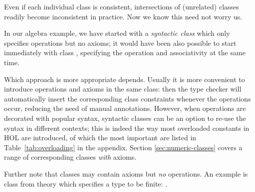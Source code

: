 \begin{isabellebody}
\begin{isamarkuptext}
Even if each individual class is consistent, intersections of
(unrelated) classes readily become inconsistent in practice. Now we
know this need not worry us.%
\end{isamarkuptext}%
\isamarkuptrue%
%
\isamarkuptrue%
%
\begin{isamarkuptext}%
In our algebra example, we have started with a \emph{syntactic
class}  which only specifies operations but no axioms; it
would have been also possible to start immediately with class , specifying the  operation and associativity at
the same time.

Which approach is more appropriate depends.  Usually it is more
convenient to introduce operations and axioms in the same class: then
the type checker will automatically insert the corresponding class
constraints whenever the operations occur, reducing the need of manual
annotations.  However, when operations are decorated with popular
syntax, syntactic classes can be an option to re-use the syntax in
different contexts; this is indeed the way most overloaded constants
in HOL are introduced, of which the most important are listed in
Table~\ref{tab:overloading} in the appendix.  Section
\ref{sec:numeric-classes} covers a range of corresponding classes
\emph{with} axioms.

Further note that classes may contain axioms but \emph{no} operations.
An example is class  from theory 
which specifies a type to be finite: .%
\end{isamarkuptext}%
\isamarkuptrue%
%
\isadelimtheory
%
\endisadelimtheory
%
\isatagtheory
%
\endisatagtheory
{\isafoldtheory}%
%
\isadelimtheory
%
\endisadelimtheory
\end{isabellebody}%

